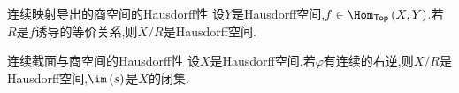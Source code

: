 \begin{proposition}{连续映射导出的商空间的Hausdorff性}{}
	设$Y$是Hausdorff空间,$f\in\Hom_{\mathsf{Top}}\left(X,Y\right)$.若$R$是$f$诱导的等价关系,则$X/R$是Hausdorff空间.
\end{proposition}

\begin{proposition}{连续截面与商空间的Hausdorff性}{}
	设$X$是Hausdorff空间.若$\varphi$有连续的右逆,则$X/R$是Hausdorff空间,$\im\left(s\right)$是$X$的闭集.
\end{proposition}






























